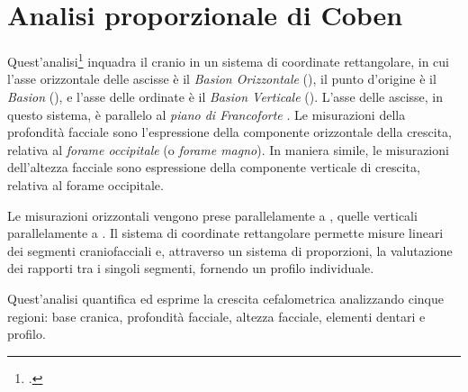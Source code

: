\chapter{Analisi proporzionale di Coben}

Quest'analisi\footcite{Coben1979,Manetti1984,Coben1985,Antonini1986} inquadra il cranio in un sistema di coordinate rettangolare, in cui l'asse orizzontale delle ascisse è il \textit{Basion Orizzontale} (), il punto d'origine è il \textit{Basion} (), e l'asse delle ordinate è il \textit{Basion Verticale} (). L'asse delle ascisse, in questo sistema, è parallelo al \emph{piano di Francoforte} . Le misurazioni della profondità facciale sono l'espressione della componente orizzontale della crescita, relativa al \textit{forame occipitale} (o \textit{forame magno}). In maniera simile, le misurazioni dell'altezza facciale sono espressione della componente verticale di crescita, relativa al forame occipitale.

Le misurazioni orizzontali vengono prese parallelamente a , quelle verticali parallelamente a . Il sistema di coordinate rettangolare permette misure lineari dei segmenti craniofacciali e, attraverso un sistema di proporzioni, la valutazione dei rapporti tra i singoli segmenti, fornendo un profilo individuale.

Quest'analisi quantifica ed esprime la crescita cefalometrica analizzando cinque regioni: base cranica, profondità facciale, altezza facciale, elementi dentari e profilo.



